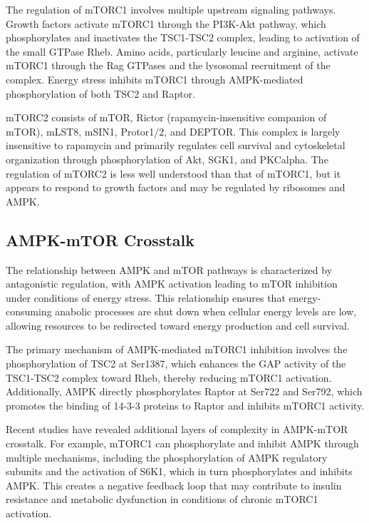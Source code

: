 \documentclass[11
pt,a4paper]{article}
\begin{document}


The regulation of mTORC1 involves multiple upstream signaling pathways. Growth factors activate mTORC1 through the PI3K-Akt pathway, which phosphorylates and inactivates the TSC1-TSC2 complex, leading to activation of the small GTPase Rheb. Amino acids, particularly leucine and arginine, activate mTORC1 through the Rag GTPases and the lysosomal recruitment of the complex. Energy stress inhibits mTORC1 through AMPK-mediated phosphorylation of both TSC2 and Raptor.

mTORC2 consists of mTOR, Rictor (rapamycin-insensitive companion of mTOR), mLST8, mSIN1, Protor1/2, and DEPTOR. This complex is largely insensitive to rapamycin and primarily regulates cell survival and cytoskeletal organization through phosphorylation of Akt, SGK1, and PKCalpha. The regulation of mTORC2 is less well understood than that of mTORC1, but it appears to respond to growth factors and may be regulated by ribosomes and AMPK.

\subsection{AMPK-mTOR Crosstalk}

The relationship between AMPK and mTOR pathways is characterized by antagonistic regulation, with AMPK activation leading to mTOR inhibition under conditions of energy stress. This relationship ensures that energy-consuming anabolic processes are shut down when cellular energy levels are low, allowing resources to be redirected toward energy production and cell survival.

The primary mechanism of AMPK-mediated mTORC1 inhibition involves the phosphorylation of TSC2 at Ser1387, which enhances the GAP activity of the TSC1-TSC2 complex toward Rheb, thereby reducing mTORC1 activation. Additionally, AMPK directly phosphorylates Raptor at Ser722 and Ser792, which promotes the binding of 14-3-3 proteins to Raptor and inhibits mTORC1 activity.

Recent studies have revealed additional layers of complexity in AMPK-mTOR crosstalk. For example, mTORC1 can phosphorylate and inhibit AMPK through multiple mechanisms, including the phosphorylation of AMPK regulatory subunits and the activation of S6K1, which in turn phosphorylates and inhibits AMPK. This creates a negative feedback loop that may contribute to insulin resistance and metabolic dysfunction in conditions of chronic mTORC1 activation.
\end{document}
